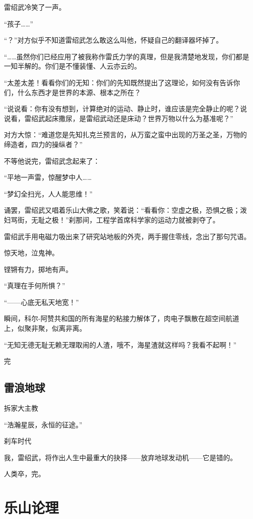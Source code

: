 \documentclass[UTF8,12pt,oneside]{ctexbook}
\begin{document}
雷绍武冷笑了一声。

“孩子……”

“？”对方似乎不知道雷绍武怎么敢这么叫他，怀疑自己的翻译器坏掉了。

“……虽然你们已经应用了被我称作雷氏力学的真理，但是我清楚地发现，你们都是一知半解的。你们是不懂装懂、人云亦云的。

“太差太差！看看你们的无知：你们的先知既然提出了这理论，如何没有告诉你们，什么东西才是世界的本源、根本之所在？

“说说看：你有没有想到，计算绝对的运动、静止时，谁应该是完全静止的呢？说说看，雷绍武起床撒尿，是雷绍武动还是床动？世界万物以什么为基准呢？”

对方大惊：“难道您是先知扎克兰预言的，从万蛮之蛮中出现的万圣之圣，万物的缔造者，四力的操纵者？”

不等他说完，雷绍武念起来了：

“平地一声雷，惊醒梦中人……

“梦幻全扫光，人人能思维！”

诵罢，雷绍武又唱着乐山大佛之歌，笑着说：“看看你：空虚之极，恐惧之极；泼妇骂街，无耻之极！”刹那间，工程学首席科学家的运动力就被剥夺了。

雷绍武手用电磁力吸出来了研究站地板的外壳，两手握住零线，念出了那句咒语。

惊天地，泣鬼神。

铿锵有力，掷地有声。

“真理在手何所惧？”

“——心底无私天地宽！”

瞬间，科尔-阿赞共和国的所有海星的粘接力解体了，肉电子飘散在超空间航道上，似聚非聚，似离非离。

“无知无德无耻无赖无理取闹的人渣，哦不，海星渣就这样吗？我看不起啊！”

\hfill{完}

\section{雷浪地球}
\begin{center}
    拆家大主教
\end{center}

\noindent “浩瀚星辰，永恒的征途。”

\noindent 刹车时代

我，雷绍武，将作出人生中最重大的抉择——放弃地球发动机——它是错的。

人类卒，完。

\chapter{乐山论理}
\end{document}
